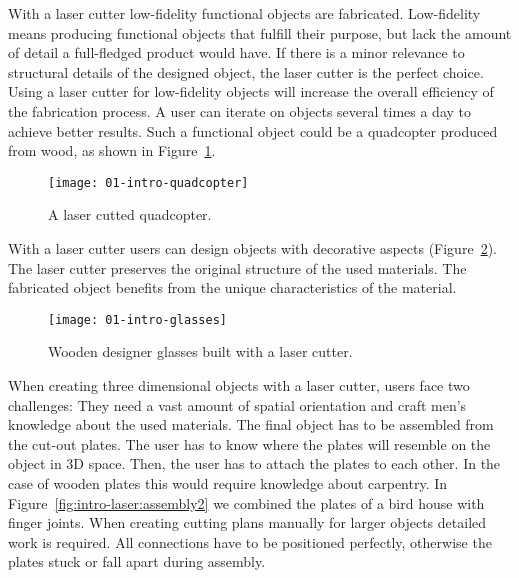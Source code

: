 \documentclass[../ClassicThesis.tex]{subfiles}
\begin{document}
With a laser cutter low-fidelity functional objects are
fabricated. Low-fidelity means producing functional objects
that fulfill their purpose, but lack the amount of detail a
full-fledged product would have. If there is a minor
relevance to structural details of the designed object, the
laser cutter is the perfect choice. Using a laser cutter for
low-fidelity objects will increase the overall efficiency of
the fabrication process. A user can iterate on objects
several times a day to achieve better results.
Such a functional object could be a quadcopter produced from
wood, as shown in Figure~\ref{fig:intro-quadcopter}.

\begin{figure}
  \texttt{[image: 01-intro-quadcopter]}
  \caption{A laser cutted quadcopter.}
  \label{fig:intro-quadcopter}
\end{figure}

With a laser cutter users can design objects with decorative
aspects (Figure~\ref{fig:intro-glasses}). The laser cutter
preserves the original structure of the used materials. The
fabricated object benefits from the unique characteristics
of the material.

\begin{figure}
  \texttt{[image: 01-intro-glasses]}
  \caption{Wooden designer glasses built with a laser cutter.}
  \label{fig:intro-glasses}
\end{figure}


When creating three dimensional objects with a laser cutter,
users face two challenges: They need a vast amount of
spatial orientation and craft men's knowledge about the used
materials. The final object has to be assembled from the
cut-out plates. The user has to know where the plates will
resemble on the object in 3D space. Then, the user has to
attach the plates to each other. In the case of wooden
plates this would require knowledge about carpentry. In
Figure~\ref{fig:intro-laser:assembly2} we combined the
plates of a bird house with finger joints. When creating
cutting plans manually for larger objects detailed work is
required. All connections have to be positioned perfectly,
otherwise the plates stuck or fall apart during assembly.
\end{document}
